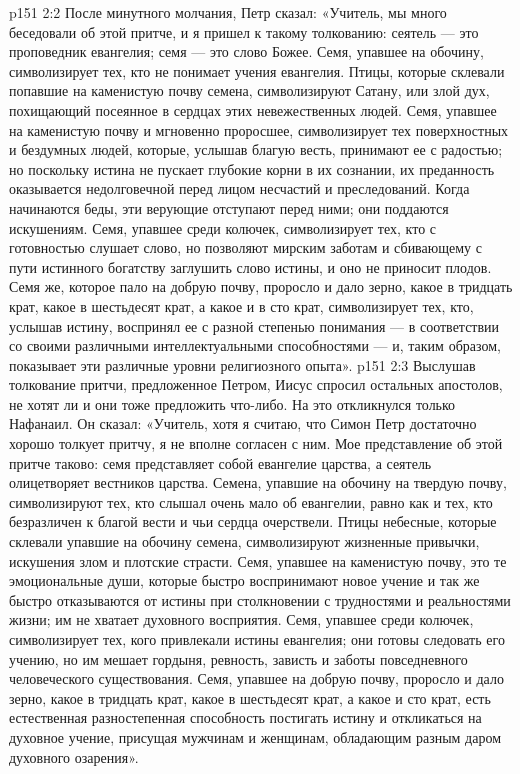 \vs p151 2:2 После минутного молчания, Петр сказал: «Учитель, мы много беседовали об этой притче, и я пришел к такому толкованию: сеятель --- это проповедник евангелия; семя --- это слово Божее. Семя, упавшее на обочину, символизирует тех, кто не понимает учения евангелия. Птицы, которые склевали попавшие на каменистую почву семена, символизируют Сатану, или злой дух, похищающий посеянное в сердцах этих невежественных людей. Семя, упавшее на каменистую почву и мгновенно проросшее, символизирует тех поверхностных и бездумных людей, которые, услышав благую весть, принимают ее с радостью; но поскольку истина не пускает глубокие корни в их сознании, их преданность оказывается недолговечной перед лицом несчастий и преследований. Когда начинаются беды, эти верующие отступают перед ними; они поддаются искушениям. Семя, упавшее среди колючек, символизирует тех, кто с готовностью слушает слово, но позволяют мирским заботам и сбивающему с пути истинного богатству заглушить слово истины, и оно не приносит плодов. Семя же, которое пало на добрую почву, проросло и дало зерно, какое в тридцать крат, какое в шестьдесят крат, а какое и в сто крат, символизирует тех, кто, услышав истину, воспринял ее с разной степенью понимания --- в соответствии со своими различными интеллектуальными способностями --- и, таким образом, показывает эти различные уровни религиозного опыта».
\vs p151 2:3 Выслушав толкование притчи, предложенное Петром, Иисус спросил остальных апостолов, не хотят ли и они тоже предложить что\hyp{}либо. На это откликнулся только Нафанаил. Он сказал: «Учитель, хотя я считаю, что Симон Петр достаточно хорошо толкует притчу, я не вполне согласен с ним. Мое представление об этой притче таково: семя представляет собой евангелие царства, а сеятель олицетворяет вестников царства. Семена, упавшие на обочину на твердую почву, символизируют тех, кто слышал очень мало об евангелии, равно как и тех, кто безразличен к благой вести и чьи сердца очерствели. Птицы небесные, которые склевали упавшие на обочину семена, символизируют жизненные привычки, искушения злом и плотские страсти. Семя, упавшее на каменистую почву, это те эмоциональные души, которые быстро воспринимают новое учение и так же быстро отказываются от истины при столкновении с трудностями и реальностями жизни; им не хватает духовного восприятия. Семя, упавшее среди колючек, символизирует тех, кого привлекали истины евангелия; они готовы следовать его учению, но им мешает гордыня, ревность, зависть и заботы повседневного человеческого существования. Семя, упавшее на добрую почву, проросло и дало зерно, какое в тридцать крат, какое в шестьдесят крат, а какое и сто крат, есть естественная разностепенная способность постигать истину и откликаться на духовное учение, присущая мужчинам и женщинам, обладающим разным даром духовного озарения».
